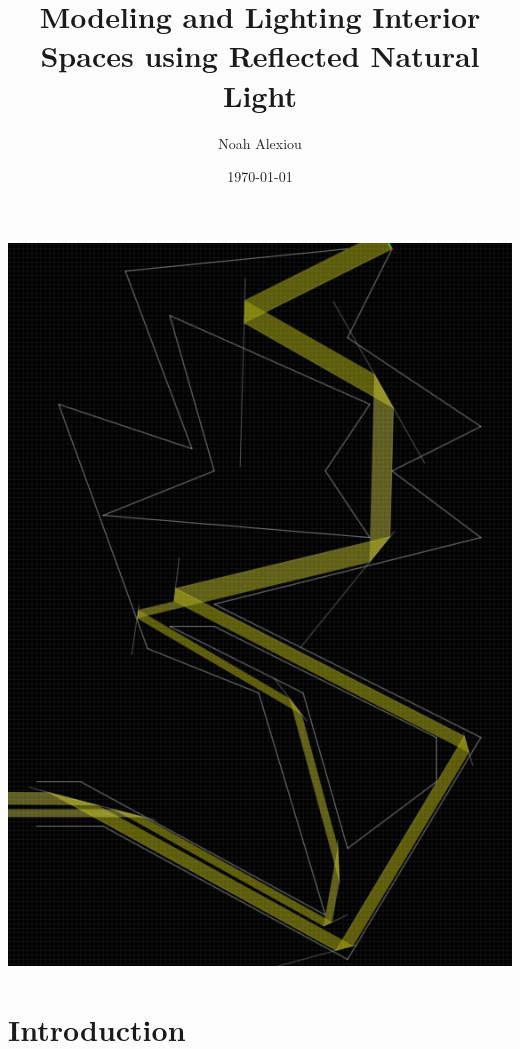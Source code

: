 \documentclass[11pt, letterpaper]{article}
\begin{document}
\begin{titlepage}
	\title{Modeling and Lighting Interior Spaces using Reflected Natural Light}
	\author{Noah Alexiou}
	\date{\today}
	
	\maketitle
	\centering
	\includegraphics[width=14cm]{cave2.png}
	
\end{titlepage}

\newpage
\tableofcontents


\newpage

\section{Introduction}
\end{document}
